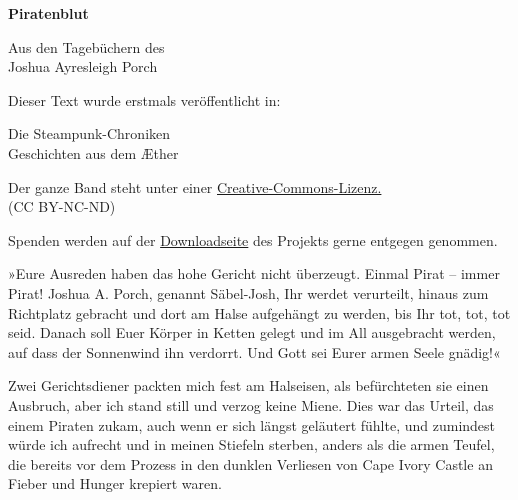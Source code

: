 \usepackage[ngerman]{babel}
\usepackage[T1]{fontenc}



\newcommand\bigpar\medskip
\newcommand\schiff\textit
\newcommand\latein\textit
\newenvironment{dekret}{\itshape}{}


\raggedbottom
\begin{center}
\textbf{\huge\textsf{Piratenblut}}

\medskip
Aus den Tagebüchern des \\
Joshua Ayresleigh Porch
\end{center}

\bigskip

\begin{flushleft}
Dieser Text wurde erstmals veröffentlicht in:
\begin{center}
Die Steampunk-Chroniken\\
Geschichten aus dem Æther
\end{center}

\bigskip

Der ganze Band steht unter einer 
\href{http://creativecommons.org/licenses/by-nc-nd/2.0/de/}{Creative-Commons-Lizenz.} \\ 
(CC BY-NC-ND)

\bigskip

Spenden werden auf der 
\href{http://steampunk-chroniken.de/download}{Downloadseite}
des Projekts gerne entgegen genommen. 
\end{flushleft}

\newpage


»Eure Ausreden haben das hohe Gericht nicht überzeugt. Einmal Pirat
– immer Pirat! Joshua A. Porch, genannt Säbel-Josh, Ihr werdet
verurteilt, hinaus zum Richtplatz gebracht und dort am Halse
aufgehängt zu werden, bis Ihr tot, tot, tot seid. Danach soll Euer
Körper in Ketten gelegt und im All ausgebracht werden, auf dass der
Sonnenwind ihn verdorrt. Und Gott sei Eurer armen Seele gnädig!«

\bigpar

Zwei Gerichtsdiener packten mich fest am Halseisen, als
befürchteten sie einen Ausbruch, aber ich stand still und verzog
keine Miene. Dies war das Urteil, das einem Piraten zukam, auch
wenn er sich längst geläutert fühlte, und zumindest würde ich
aufrecht und in meinen Stiefeln sterben, anders als die armen
Teufel, die bereits vor dem Prozess in den dunklen Verliesen von
Cape Ivory Castle an Fieber und Hunger krepiert waren.


